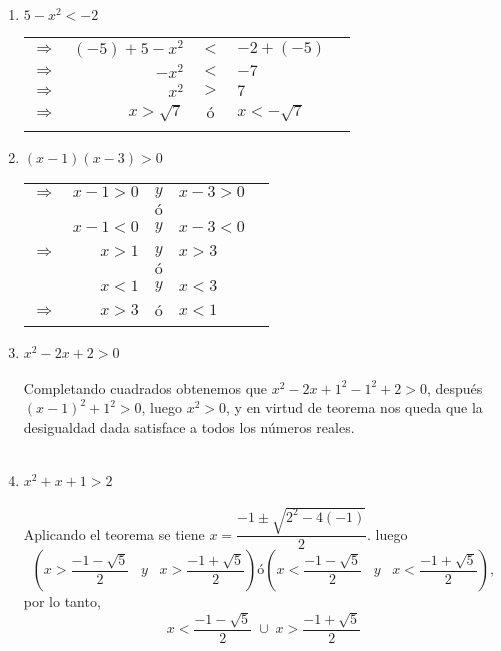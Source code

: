\begin{enumerate}[\bfseries 1.]
\begin{enumerate}[\bfseries i)]
\item $5-x^2<-2$
\begin{center}
\begin{tabular}{crcll}
$\Rightarrow$&$(-5)+5-x^2$&$<$&$-2+(-5)$&\\
$\Rightarrow$&$-x^2$&$<$&$-7$&\\
$\Rightarrow$&$x^2$&$>$&$7$&\\
$\Rightarrow$&$x>\sqrt{7}$&$ó$&$x<-\sqrt{7}$&\\\\
\end{tabular}
\end{center}

\item $(x-1)(x-3)>0$
\begin{center}
\begin{tabular}{crcll} 
$\Rightarrow$&$x-1>0$&$y$&$x-3>0$&\\
&&$ó$&&\\
&$x-1<0$&$y$&$x-3<0$&\\\\
$\Rightarrow$&$x>1$&$y$&$x>3$&\\
&&$ó$&&\\
&$x<1$&$y$&$x<3$&\\\\
$\Rightarrow$&$x>3$&$ó$&$x<1$&\\\\
\end{tabular}
\end{center}

\item $x^2-2x+2>0$\\\\
Completando cuadrados obtenemos que $x^2-2x+1^2 -1^2 +2 > 0$, después $(x-1)^2+1^2>0$, luego $x^2>0$, y en virtud de teorema nos queda que la desigualdad dada satisface a todos los números reales.\\\\ 

\item $x^2+x+1>2$\\\\
Aplicando el teorema se tiene $x=\dfrac{-1 \pm \sqrt{2^2-4(-1)}}{2}$. luego $$\left( x>\dfrac{-1-\sqrt{5}}{2} \; \; \; y \; \; \; x>\dfrac{-1+\sqrt{5}}{2} \right) ó \left( x<\dfrac{-1-\sqrt{5}}{2}\; \; \; y \; \; \; x < \dfrac{-1+\sqrt{5}}{2} \right),$$ por lo tanto, $$x<\dfrac{-1-\sqrt{5}}{2}\; \cup \; x>\dfrac{-1+\sqrt{5}}{2} $$ \\\\


\end{enumerate}
\end{enumerate}
